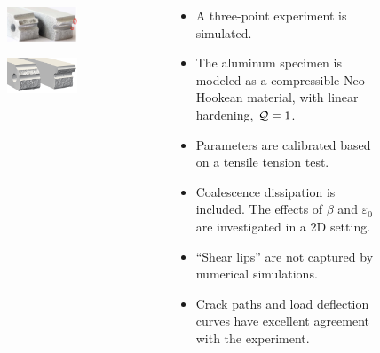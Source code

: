 \begin{frame}
\begin{columns}[T]
\begin{column}{0.6\textwidth}
\begin{figure}
        \begin{subfigure}[b]{0.45\textwidth}
          \centering
          \includegraphics[width=0.9\textwidth,scale=0.5]{Chapter345/figures/split_experiment}
        \end{subfigure}
        \begin{subfigure}[b]{0.45\textwidth}
          \centering
          \includegraphics[width=0.9\textwidth,scale=0.5]{Chapter345/figures/split}
        \end{subfigure}
      \end{figure}
    \end{column}
    \begin{column}{0.4\textwidth}
      \begin{itemize}
        \item A three-point experiment is simulated.
        \item The aluminum specimen is modeled as a compressible Neo-Hookean material, with linear hardening, $\mathcal{Q} = 1$.
        \item Parameters are calibrated based on a tensile tension test.
        \item Coalescence dissipation is included. The effects of $\beta$ and $\varepsilon_0$ are investigated in a 2D setting.
        \item ``Shear lips'' are not captured by numerical simulations.
        \item Crack paths and load deflection curves have excellent agreement with the experiment.
      \end{itemize}
    \end{column}
  \end{columns}
\end{frame}

